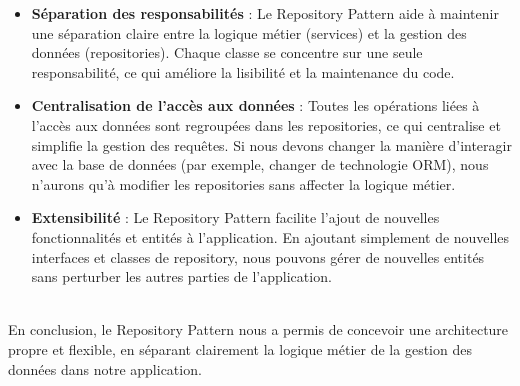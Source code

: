 \begin{itemize}
    \item \textbf{Séparation des responsabilités} : Le Repository Pattern aide à maintenir une séparation claire entre la logique métier (services) et la gestion des données (repositories). Chaque classe se concentre sur une seule responsabilité, ce qui améliore la lisibilité et la maintenance du code.
    \item \textbf{Centralisation de l'accès aux données} : Toutes les opérations liées à l’accès aux données sont regroupées dans les repositories, ce qui centralise et simplifie la gestion des requêtes. Si nous devons changer la manière d’interagir avec la base de données (par exemple, changer de technologie ORM), nous n’aurons qu'à modifier les repositories sans affecter la logique métier.
    \item \textbf{Extensibilité} : Le Repository Pattern facilite l’ajout de nouvelles fonctionnalités et entités à l’application. En ajoutant simplement de nouvelles interfaces et classes de repository, nous pouvons gérer de nouvelles entités sans perturber les autres parties de l’application.
\end{itemize}
\\

En conclusion, le Repository Pattern nous a permis de concevoir une architecture propre et flexible, en séparant clairement la logique métier de la gestion des données dans notre application.

